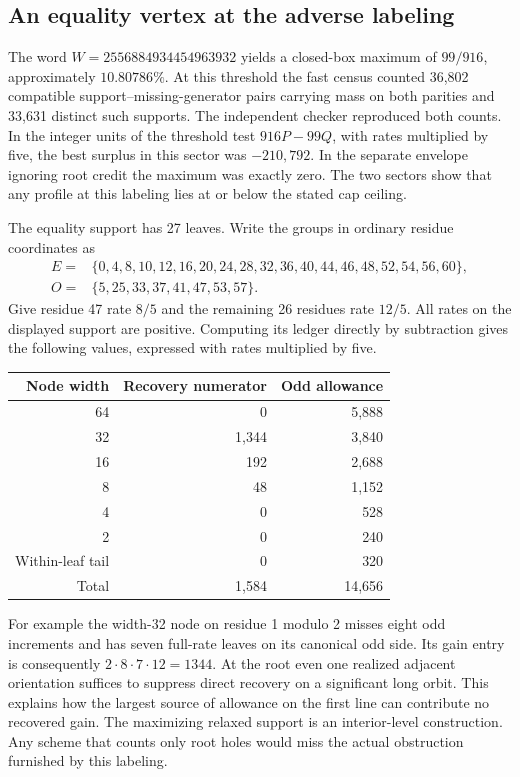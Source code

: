 \documentclass[12pt,letterpaper]{article}
\begin{document}
\subsection{An equality vertex at the adverse labeling}

The word \(W=2556884934454963932\) yields a closed-box maximum of \(99/916\), approximately \(10.80786\%\). At this threshold the fast census counted 36,802 compatible support--missing-generator pairs carrying mass on both parities and 33,631 distinct such supports. The independent checker reproduced both counts. In the integer units of the threshold test \(916P-99Q\), with rates multiplied by five, the best surplus in this sector was \(-210{,}792\). In the separate envelope ignoring root credit the maximum was exactly zero. The two sectors show that any profile at this labeling lies at or below the stated cap ceiling.

The equality support has 27 leaves. Write the groups in ordinary residue coordinates as
\[
\begin{aligned}
 E={}&\{0,4,8,10,12,16,20,24,28,32,36,40,44,46,48,52,54,56,60\},\\
 O={}&\{5,25,33,37,41,47,53,57\}.
\end{aligned}
\]
Give residue 47 rate \(8/5\) and the remaining 26 residues rate \(12/5\). All rates on the displayed support are positive. Computing its ledger directly by subtraction gives the following values, expressed with rates multiplied by five.
\begin{center}
\begin{tabular}{@{}rrr@{}}\toprule
Node width & Recovery numerator & Odd allowance\\\midrule
64 &0 &5,888\\
32 &1,344 &3,840\\
16 &192 &2,688\\
8  &48 &1,152\\
4  &0 &528\\
2  &0 &240\\
Within-leaf tail &0 &320\\\midrule
Total &1,584 &14,656\\\bottomrule
\end{tabular}
\end{center}
For example the width-32 node on residue 1 modulo 2 misses eight odd increments and has seven full-rate leaves on its canonical odd side. Its gain entry is consequently \(2\cdot8\cdot7\cdot12=1344\). At the root even one realized adjacent orientation suffices to suppress direct recovery on a significant long orbit. This explains how the largest source of allowance on the first line can contribute no recovered gain. The maximizing relaxed support is an interior-level construction. Any scheme that counts only root holes would miss the actual obstruction furnished by this labeling.
\end{document}

